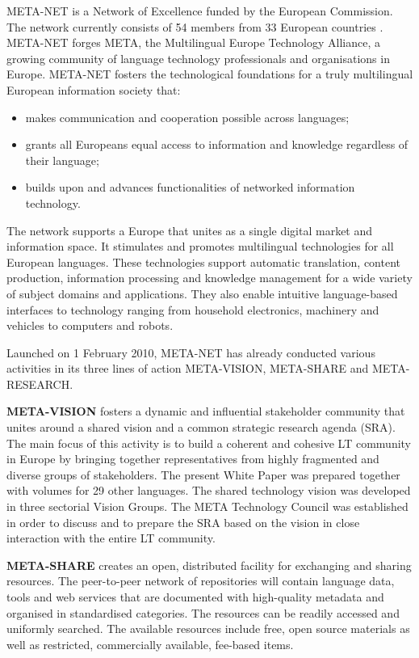 \begin{multicols}{2}
META-NET is a Network of Excellence funded by the European Commission. The network currently consists of 54 members from 33 European countries \cite{rehm2011}. META-NET forges META, the Multilingual Europe Technology Alliance, a growing community of language technology professionals and organisations in Europe. META-NET fosters the technological foundations for a truly multilingual European information society that:

\begin{itemize}
\item makes communication and cooperation possible across languages;
\item grants all Europeans equal access to information and knowledge regardless of their language; 
\item builds upon and advances functionalities of networked information technology.
\end{itemize}

The network supports a Europe that unites as a single digital market and information space. It stimulates and promotes multilingual technologies for all European languages. These technologies support automatic translation, content production, information processing and knowledge management for a wide variety of subject domains and applications. They also enable intuitive language-based interfaces to technology ranging from household electronics, machinery and vehicles to computers and robots.

Launched on 1 February 2010, META-NET has already conducted various activities in its three lines of action META-VISION, META-SHARE and META-RESEARCH. 

\textbf{META-VISION} fosters a dynamic and inﬂuential stakeholder community that unites around a shared vision and a common strategic research agenda (SRA). The main focus of this activity is to build a coherent and cohesive LT community in Europe by bringing together representatives from highly fragmented and diverse groups of stakeholders. The present White Paper was prepared together with volumes for 29 other languages. The shared technology vision was developed in three sectorial Vision Groups. The META Technology Council was established in order to discuss and to prepare the SRA based on the vision in close interaction with the entire LT community. 

\textbf{META-SHARE} creates an open, distributed facility for exchanging and sharing resources. The peer-to-peer network of repositories will contain language data, tools and web services that are documented with high-quality metadata and organised in standardised categories. The resources can be readily accessed and uniformly searched. The available resources include free, open source materials as well as restricted, commercially available, fee-based items. 


\end{multicols}
